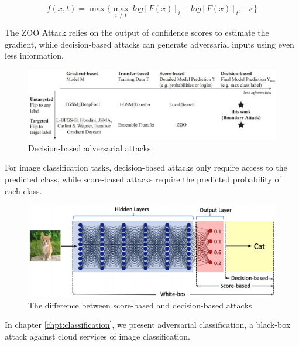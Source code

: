 $$f(x,t) = \max \{ {\underset{i \neq t}{\max}\ log[F(x)]_i - log[F(x)]_t, -\kappa } \}$$

The ZOO Attack relies on the output of confidence scores to estimate the gradient, while decision-based attacks can generate adversarial inputs using even less information.

\begin{figure}[H]
\centering
\includegraphics[scale=0.45]{figures/chapter_intro/query-efficient.jpg}
\caption{Decision-based adversarial attacks \cite{brendel2018decisionbased}}
\label{fig.query}
\end{figure}

For image classification tasks, decision-based attacks only require access to the predicted class, while score-based attacks require the predicted probability of each class.

\begin{figure}[H]
\centering
\includegraphics[scale=0.35]{figures/chapter_intro/score-decision.jpg}
\caption{The difference between score-based and decision-based attacks \cite{chen2020hopskipjumpattack}}
\label{fig.decision}
\end{figure}

In chapter \ref{chpt:classification}, we present adversarial classification, a black-box attack against cloud services of image classification.
